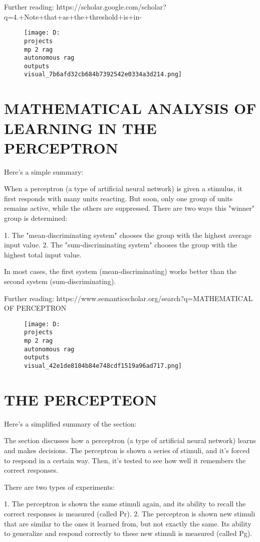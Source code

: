 \documentclass[12pt,a4paper]{article}
\begin{document}
Further reading: https://scholar.google.com/scholar?q=4.+Note+that+as+the+threshold+is+in-
\begin{figure}[h]
\centering
\texttt{[image: D:\\projects\\mp 2 rag\\autonomous rag\\outputs\\visual\_7b6afd32cb684b7392542e0334a3d214.png]}
\end{figure}
\section{MATHEMATICAL ANALYSIS
OF LEARNING IN THE
PERCEPTRON}
Here's a simple summary:

When a perceptron (a type of artificial neural network) is given a stimulus, it first responds with many units reacting. But soon, only one group of units remains active, while the others are suppressed. There are two ways this "winner" group is determined:

1. The "mean-discriminating system" chooses the group with the highest average input value.
2. The "sum-discriminating system" chooses the group with the highest total input value.

In most cases, the first system (mean-discriminating) works better than the second system (sum-discriminating).

Further reading: https://www.semanticscholar.org/search?q=MATHEMATICAL%
OF%
PERCEPTRON
\begin{figure}[h]
\centering
\texttt{[image: D:\\projects\\mp 2 rag\\autonomous rag\\outputs\\visual\_42e1de8104b84e748cdf1519a96ad717.png]}
\end{figure}
\section{THE PERCEPTEON}
Here's a simplified summary of the section:

The section discusses how a perceptron (a type of artificial neural network) learns and makes decisions. The perceptron is shown a series of stimuli, and it's forced to respond in a certain way. Then, it's tested to see how well it remembers the correct responses.

There are two types of experiments:

1. The perceptron is shown the same stimuli again, and its ability to recall the correct responses is measured (called Pr).
2. The perceptron is shown new stimuli that are similar to the ones it learned from, but not exactly the same. Its ability to generalize and respond correctly to these new stimuli is measured (called Pg).
\end{document}
